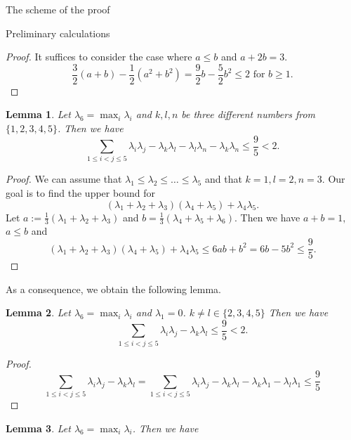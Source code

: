 \documentclass[12pt]{article}
\newtheorem{lemma}{Lemma}[section]
\begin{document}
\begin{section}{The scheme of the proof}
\begin{section}{Preliminary calculations}
\begin{proof}
    It suffices to consider the case where $a\leq b$ and $a+2b = 3$.  
    $$
        \frac{3}{2}(a+b) - \frac{1}{2}(a^{2}+b^{2}) = \frac{9}{2}b - \frac{5}{2}b^2\leq 2 \text{ for $b\geq 1$.}
    $$
    \end{proof}
    
    \begin{lemma}
    \label{lemma3.4}
        Let $\lambda_{6} = \max_{i}\lambda_{i}$ and $k,l,n$ be three different  numbers from $\{1,2,3,4,5\}$. Then we have 
        $$
            \sum_{1\leq i<j\leq 5}\lambda_{i}\lambda_{j} - \lambda_{k}\lambda_{l} - \lambda_{l}\lambda_{n} - \lambda_{k}\lambda_{n}\leq \frac{9}{5} < 2.
        $$
    \end{lemma}
    
    \begin{proof}
        We can assume that $\lambda_{1}\leq \lambda_{2}\leq \ldots \leq \lambda_{5}$ and that $k=1, l=2, n=3$. Our goal is to find the upper bound for 
        $$          (\lambda_{1}+\lambda_{2}+\lambda_{3})(\lambda_{4}+\lambda_{5}) + \lambda_{4}\lambda_{5}.
        $$
        Let $a := \frac{1}{3}(\lambda_{1} + \lambda_{2} + \lambda_{3})$ and $b = \frac{1}{3}(\lambda_{4} + \lambda_{5} + \lambda_{6})$. Then we have $a + b = 1 ,$ $a\leq b$ and 
        $$
            (\lambda_{1}+\lambda_{2}+\lambda_{3})(\lambda_{4}+\lambda_{5}) + \lambda_{4}\lambda_{5} \leq 6ab + b^2 = 6b - 5b^2 \leq \frac{9}{5}.
        $$
       
        
    \end{proof}
    As a consequence, we obtain the following lemma. 
     \begin{lemma}
    \label{lemma3.5}
         Let $\lambda_{6} = \max_{i}\lambda_{i}$ and $\lambda_{1}=0$. $k\neq l \in \{2,3,4,5\}$ Then we have 
         $$
            \sum_{1\leq i<j\leq 5}\lambda_{i}\lambda_{j}  - \lambda_{k}\lambda_{l} \leq \frac{9}{5} 
 < 2.
         $$
    \end{lemma}

    \begin{proof}
          $$
            \sum_{1\leq i<j\leq 5}\lambda_{i}\lambda_{j}  - \lambda_{k}\lambda_{l} = \sum_{1\leq i<j\leq 5}\lambda_{i}\lambda_{j}  - \lambda_{k}\lambda_{l} - \lambda_{k}\lambda_{1} - \lambda_{l} \lambda_{1}  \leq \frac{9}{5} 
         $$
    \end{proof}

    \begin{lemma}
    \label{lemma3.6}
         Let $\lambda_{6} = \max_{i}\lambda_{i}$. Then we have
         

\end{lemma}
\end{section}
\end{section}
\end{document}
